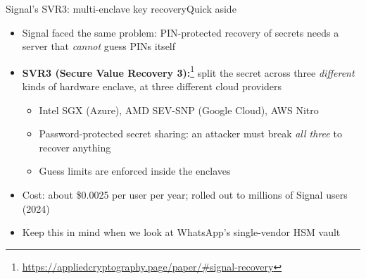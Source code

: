 \ifdefined\PRESENTATION\else\PassOptionsToClass{handout}{beamer}\fi\documentclass[aspectratio=169, lualatex]{beamer}
\begin{document}
\begin{frame}{Signal's SVR3: multi-enclave key recovery}{Quick aside}
	\begin{itemize}
		\item Signal faced the same problem: PIN-protected recovery of secrets needs a server that \textit{cannot} guess PINs itself
		\item \textbf{SVR3 (Secure Value Recovery 3):}\footnote{\url{https://appliedcryptography.page/paper/\#signal-recovery}} split the secret across three \textit{different} kinds of hardware enclave, at three different cloud providers
		      \begin{itemize}
			      \item Intel SGX (Azure), AMD SEV-SNP (Google Cloud), AWS Nitro
			      \item Password-protected secret sharing: an attacker must break \textit{all three} to recover anything
			      \item Guess limits are enforced inside the enclaves
		      \end{itemize}
		\item Cost: about \$0.0025 per user per year; rolled out to millions of Signal users (2024)
		\item Keep this in mind when we look at WhatsApp's single-vendor HSM vault
	\end{itemize}
\end{frame}
\end{document}
